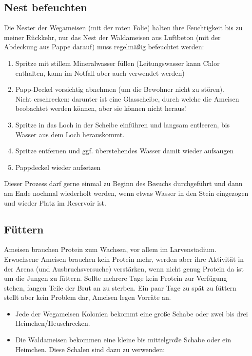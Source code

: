 \subsection{Nest befeuchten}
Die Nester der Wegameisen (mit der roten Folie) halten ihre Feuchtigkeit bis zu meiner Rückkehr,
nur das Nest der Waldameisen aus Luftbeton (mit der Abdeckung aus Pappe darauf) muss regelmäßig befeuchtet werden:
\begin{enumerate}
  \item Spritze mit stillem Mineralwasser füllen
        (Leitungswasser kann Chlor enthalten, kann im Notfall aber auch verwendet werden)
  \item Papp-Deckel vorsichtig abnehmen (um die Bewohner nicht zu stören).\\
        Nicht erschrecken: darunter ist eine Glasscheibe, durch welche die Ameisen beobachtet werden können, aber sie können nicht heraus!
  \item Spritze in das Loch in der Scheibe einführen und langsam entleeren, bis Wasser aus dem Loch herauskommt.
  \item Spritze entfernen und ggf. überstehendes Wasser damit wieder aufsaugen
  \item Pappdeckel wieder aufsetzen
\end{enumerate}
Dieser Prozess darf gerne einmal zu Beginn des Besuchs durchgeführt und dann am Ende nochmal wiederholt werden,
wenn etwas Wasser in den Stein eingezogen und wieder Platz im Reservoir ist.

\subsection{Füttern}
Ameisen brauchen Protein zum Wachsen, vor allem im Larvenstadium.
Erwachsene Ameisen brauchen kein Protein mehr, werden aber ihre Aktivität in der Arena
(und Ausbruchsversuche) verstärken, wenn nicht genug Protein da ist um die Jungen zu füttern.
Sollte mehrere Tage kein Protein zur Verfügung stehen, fangen Teile der Brut an zu sterben.
Ein paar Tage zu spät zu füttern stellt aber kein Problem dar, Ameisen legen Vorräte an.

\begin{itemize}
  \item Jede der Wegameisen Kolonien bekommt eine große Schabe
        oder zwei bis drei Heimchen/Heuschrecken.
  \item Die Waldameisen bekommen eine kleine bis mittelgroße Schabe oder ein Heimchen.
        Diese Schalen sind dazu zu verwenden:
\end{itemize}

